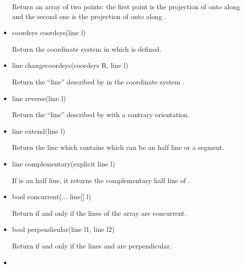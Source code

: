 \documentclass[pdftex]{article}
\begin{document}
\begin{itemize}
\begin{Vcolor}
  \end{Vcolor}
  Return an array of two points: the first point is the projection of
   onto  along  and the second one is the
  projection of  onto  along .
\item {}%
  \begin{Vcolor}
    coordsys coordsys(line l)
  \end{Vcolor}
  Return the coordinate system in which  is defined.
\item {}%
  \begin{Vcolor}
    line changecoordsys(coordsys R, line l)
  \end{Vcolor}
  Return the ``line'' described by  in the coordinate system .
\item {}%
  \begin{Vcolor}
    line reverse(line l)
  \end{Vcolor}
  Return the ``line'' described by  with a contrary orientation.
\item {}%
  \begin{Vcolor}
    line extend(line l)
  \end{Vcolor}
  Return the line which contains  which can be an half line or a segment.
\item {}%
  \begin{Vcolor}
    line complementary(explicit line l)
  \end{Vcolor}
  If  is an half line, it returns the complementary half line
  of .
\item {}%
  \begin{Vcolor}
    bool concurrent(... line[] l)
  \end{Vcolor}
  Return  if and only if the lines of the array
   are concurrent.
\item {}%
  \begin{Vcolor}
    bool perpendicular(line l1, line l2)
  \end{Vcolor}
  Return  if and only if the lines 
  and  are perpendicular.
\item {}%

\end{itemize}
\end{document}
